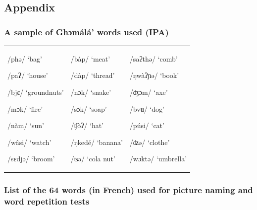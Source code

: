\documentclass[output=paper,newtxmath,modfonts,nonflat,draftmode]{langsci/langscibook}
\begin{document}
\clearpage
\subsection{Appendix}
\subsubsection{A sample of Ghɔmálá’ words used (IPA)}

\begin{tabularx}{\textwidth}{XXX}
/phə/ ‘bag’

/paʔ/ ‘house’

/bjɛ/ ‘groundnuts’

/mɔk/ ‘fire’

/nàm/ ‘sun’

/wâsi/ ‘watch’

/sɛdjə/ ‘broom’ & /bàp/ ‘meat’

/dàp/ ‘thread’

/nɔk/ ‘snake’

/sɔk/ ‘soap’

/ʧòʔ/ ‘hat’

/ŋkedé/ ‘banana’

/ʦə/ ‘cola nut’ & /saʔthə/   ‘comb’

/ŋwàʔɲə/ ‘book’

/ʤɔm/ ‘axe’

/bvʉ/ ‘dog’

/púsi/ ‘cat’

/ʣə/ ‘clothe’

/wɔktə/ ‘umbrella’\\
\end{tabularx}


\subsubsection{List of the 64 words (in French) used for picture naming and word repetition tests }
\end{document}
